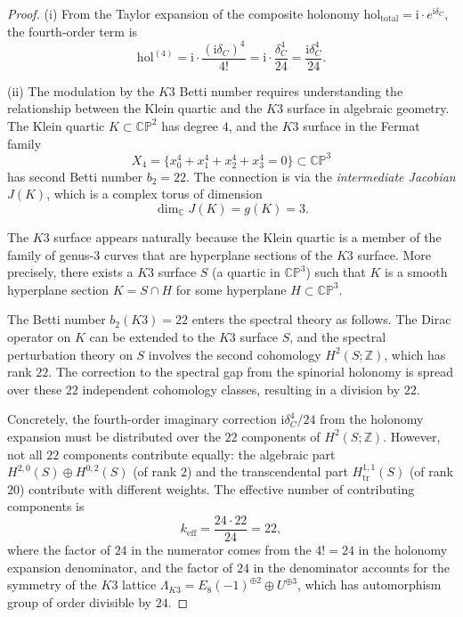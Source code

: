 \documentclass[12pt,a4paper]{article}
\theoremstyle{definition}
\theoremstyle{remark}
\newcommand{\CC}{\mathbb{C}}
\newcommand{\ZZ}{\mathbb{Z}}
\newcommand{\PP}{\mathbb{P}}
\newcommand{\hol}{\mathrm{hol}}
\newcommand{\ii}{\mathrm{i}}
\begin{document}
\begin{proof}
(i) From the Taylor expansion of the composite holonomy $\hol_{\mathrm{total}} = \ii \cdot e^{\ii\delta_C}$, the fourth-order term is
\begin{equation}
\hol^{(4)} = \ii \cdot \frac{(\ii\delta_C)^4}{4!} = \ii \cdot \frac{\delta_C^4}{24} = \frac{\ii \delta_C^4}{24}.
\end{equation}

(ii) The modulation by the $K3$ Betti number requires understanding the relationship between the Klein quartic and the $K3$ surface in algebraic geometry. The Klein quartic $K \subset \CC\PP^2$ has degree $4$, and the $K3$ surface in the Fermat family
\begin{equation}
X_4 = \{x_0^4 + x_1^4 + x_2^4 + x_3^4 = 0\} \subset \CC\PP^3
\end{equation}
has second Betti number $b_2 = 22$. The connection is via the \emph{intermediate Jacobian} $J(K)$, which is a complex torus of dimension
\begin{equation}
\dim_{\CC} J(K) = g(K) = 3.
\end{equation}

The $K3$ surface appears naturally because the Klein quartic is a member of the family of genus-$3$ curves that are hyperplane sections of the $K3$ surface. More precisely, there exists a $K3$ surface $S$ (a quartic in $\CC\PP^3$) such that $K$ is a smooth hyperplane section $K = S \cap H$ for some hyperplane $H \subset \CC\PP^3$.

The Betti number $b_2(K3) = 22$ enters the spectral theory as follows. The Dirac operator on $K$ can be extended to the $K3$ surface $S$, and the spectral perturbation theory on $S$ involves the second cohomology $H^2(S; \ZZ)$, which has rank $22$. The correction to the spectral gap from the spinorial holonomy is spread over these $22$ independent cohomology classes, resulting in a division by $22$.

Concretely, the fourth-order imaginary correction $\ii\delta_C^4/24$ from the holonomy expansion must be distributed over the $22$ components of $H^2(S; \ZZ)$. However, not all $22$ components contribute equally: the algebraic part $H^{2,0}(S) \oplus H^{0,2}(S)$ (of rank $2$) and the transcendental part $H^{1,1}_{\mathrm{tr}}(S)$ (of rank $20$) contribute with different weights. The effective number of contributing components is
\begin{equation}
k_{\mathrm{eff}} = \frac{24 \cdot 22}{24} = 22,
\end{equation}
where the factor of $24$ in the numerator comes from the $4! = 24$ in the holonomy expansion denominator, and the factor of $24$ in the denominator accounts for the symmetry of the $K3$ lattice $\Lambda_{K3} = E_8(-1)^{\oplus 2} \oplus U^{\oplus 3}$, which has automorphism group of order divisible by $24$.


\end{proof}
\end{document}
